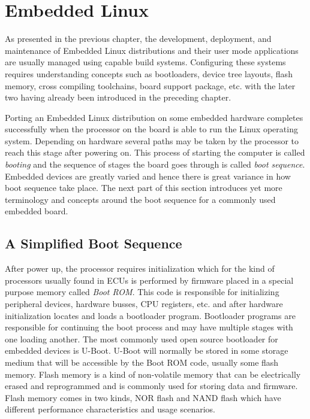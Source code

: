
\section{Embedded Linux}

As presented in the previous chapter, the development, deployment, and maintenance of Embedded Linux distributions and their user mode applications are usually managed using capable build systems. Configuring these systems requires understanding concepts such as bootloaders, device tree layouts, flash memory, cross compiling toolchains, board support package, etc. with the later two having already been introduced in the preceding chapter.

Porting an Embedded Linux distribution on some embedded hardware completes successfully when the processor on the board is able to run the Linux operating system. Depending on hardware several paths may be taken by the processor to reach this stage after powering on. This process of starting the computer is called \textit{booting} and the sequence of stages the board goes through is called \textit{boot sequence}. Embedded devices are greatly varied and hence there is great variance in how boot sequence take place. The next part of this section introduces yet more terminology and concepts around the boot sequence for a commonly used embedded board.

\subsection{A Simplified Boot Sequence}

After power up, the processor requires initialization which for the kind of processors usually found in ECUs is performed by firmware placed in a special purpose memory called \textit{Boot ROM}. This code is responsible for initializing peripheral devices, hardware busses, CPU registers, etc. and after hardware initialization locates and loads a bootloader program. Bootloader programs are responsible for continuing the boot process and may have multiple stages with one loading another. The most commonly used open source bootloader for embedded devices is U-Boot. U-Boot will normally be stored in some storage medium that will be accessible by the Boot ROM code, usually some flash memory. Flash memory is a kind of non-volatile memory that can be electrically erased and reprogrammed and is commonly used for storing data and firmware. Flash memory comes in two kinds, NOR flash and NAND flash which have different performance characteristics and usage scenarios.

